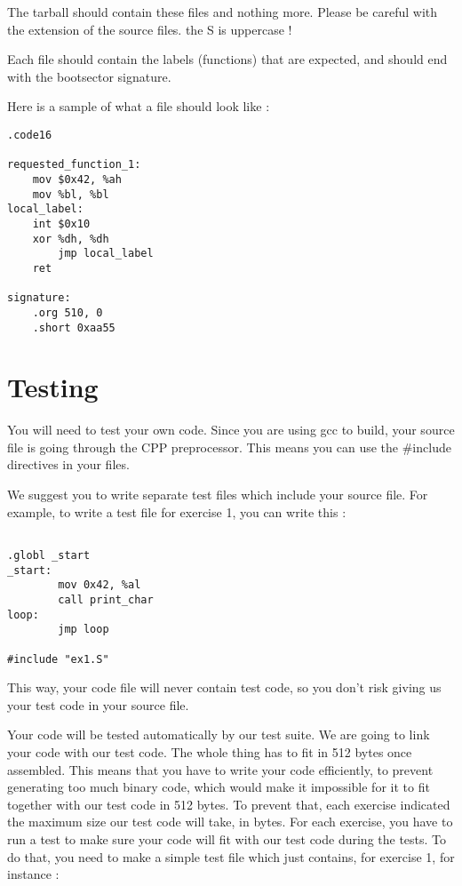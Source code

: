 The tarball should contain these files and nothing more. Please be careful with
the extension of the source files. the S is uppercase !

Each file should contain the labels (functions) that are expected, and should
end with the bootsector signature.

Here is a sample of what a file should look like :

\begin{verbatim}
.code16

requested_function_1:
	mov $0x42, %ah
	mov %bl, %bl
local_label:
	int $0x10
	xor %dh, %dh
        jmp local_label
	ret

signature:
	.org 510, 0
	.short 0xaa55

\end{verbatim}

\section{Testing}

You will need to test your own code. Since you are using gcc to build, your
source file is going through the CPP preprocessor. This means you can use
the \#include directives in your files.

We suggest you to write separate test files which include your source file.
For example, to write a test file for exercise 1, you can write this :

\begin{verbatim}

.globl _start
_start:
        mov 0x42, %al
        call print_char
loop:
        jmp loop

#include "ex1.S"

\end{verbatim}

This way, your code file will never contain test code, so you don't risk giving
us your test code in your source file.


Your code will be tested automatically by our test suite. We are going to link
your code with our test code. The whole thing has to fit in 512 bytes once assembled. This means that you have to write your code efficiently, to prevent generating too much binary code, which would make it impossible for it to fit together with our test code in 512 bytes.
To prevent that, each exercise indicated the maximum size our test code will take, in bytes.
For each exercise, you have to run a test to make sure your code will fit with our test code during the tests.
To do that, you need to make a simple test file which just contains, for exercise 1, for instance :

